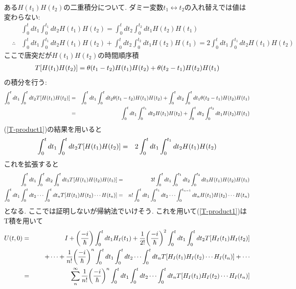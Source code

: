 \documentclass[10.5pt,a4paper]{jreport}
\begin{document}
ある$H(t_1)H(t_2)$の二重積分について. ダミー変数$t_1\leftrightarrow t_2$の入れ替えでは値は変わらない:
\begin{eqnarray}
  && \int_0^t dt_1\int_0^{t_1}dt_2H(t_1)H(t_2) = \int_0^t dt_2\int_0^{t_2}dt_1H(t_2)H(t_1)\\
  &\therefore& \int_0^t dt_1\int_0^{t_1}dt_2H(t_1)H(t_2) + \int_0^t dt_2\int_0^{t_2}dt_1H(t_2)H(t_1) = 2\int_0^t dt_1\int_0^{t_1}dt_2H(t_1)H(t_2)\label{T-product1}
\end{eqnarray}
ここで唐突だが$H(t_1)H(t_2)$の時間順序積
\begin{eqnarray}
  T\qty[H(t_1)H(t_2)] = \theta(t_1 - t_2)H(t_1)H(t_2) + \theta(t_2 - t_1)H(t_2)H(t_1)
\end{eqnarray}
の積分を行う:
\begin{eqnarray}
\nonumber  \int_0^t dt_1\int_0^{t}dt_2 T\qty[H(t_1)H(t_2)] &=& \int_0^t dt_1\int_0^{t}dt_2\theta(t_1 - t_2)H(t_1)H(t_2) + \int_0^{t}dt_2\int_0^t dt_1\theta(t_2 - t_1)H(t_2)H(t_1)\\
  &=&\int_0^t dt_1\int_0^{t_1}dt_2H(t_1)H(t_2) + \int_0^{t}dt_2\int_0^{t_2} dt_1H(t_2)H(t_1)
\end{eqnarray}
(\ref{T-product1})の結果を用いると
\begin{eqnarray}
  \int_0^t dt_1\int_0^{t}dt_2 T\qty[H(t_1)H(t_2)] &=& 2\int_0^t dt_1\int_0^{t_1}dt_2H(t_1)H(t_2)
\end{eqnarray}
これを拡張すると
\begin{eqnarray}
  \int_0^t dt_1\int_0^{t}dt_2\int_0^{t}dt_3 T\qty[H(t_1)H(t_2)H(t_3)] &=& 3!\int_0^t dt_1\int_0^{t_1}dt_2\int_0^{t_2}dt_3H(t_1)H(t_2)H(t_3)\\
  \nonumber  \int_0^t dt_1\int_0^{t}dt_2\cdots\int_0^{t}dt_n T\qty[H(t_1)H(t_2)\cdots H(t_n)] &=& n!\int_0^t dt_1\int_0^{t_1}dt_2\cdots\int_0^{t_{n-1}}dt_nH(t_1)H(t_2)\cdots H(t_n)\\
\end{eqnarray}
となる. ここでは証明しないが帰納法でいけそう. これを用いて(\ref{T-product1})はT積を用いて
\begin{eqnarray}
\nonumber  U(t, 0) &=& I + \qty(\frac{-i}{\hbar})\int_0^t dt_1 H_I(t_1) + \frac{1}{2!}\qty(\frac{-i}{\hbar})^2\int_0^t dt_1 \int_0^{t} dt_2 T\qty[H_I(t_1)H_I(t_2)]\\
&& \hspace{0.5cm}+ \cdots + \frac{1}{n!}\qty(\frac{-i}{\hbar})^n\int_0^t dt_1 \int_0^{t} dt_2\cdots\int_0^{t} dt_n T\qty[H_I(t_1)H_I(t_2)\cdots H_I(t_n)] + \cdots\\
&=& \sum_{n}^\infty\frac{1}{n!}\qty(\frac{-i}{\hbar})^n\int_0^t dt_1 \int_0^{t} dt_2\cdots\int_0^{t} dt_n T\qty[H_I(t_1)H_I(t_2)\cdots H_I(t_n)]\label{T-product2}
\end{eqnarray}
\end{document}
